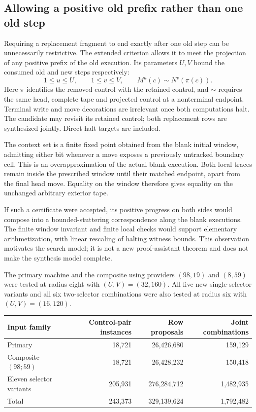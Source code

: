 \subsection{Allowing a positive old prefix rather than one old step}

Requiring a replacement fragment to end exactly after one old step can be
unnecessarily restrictive. The extended criterion allows it to meet the
projection of any positive prefix of the old execution. Its parameters
$U,V$ bound the consumed old and new steps respectively:
\[
  1\leq u\leq U,\qquad 1\leq v\leq V,
  \qquad M^{u}(c)\sim N^{v}(\pi(c)).
\]
Here $\pi$ identifies the removed control with the retained control, and
$\sim$ requires the same head, complete tape and projected control at a
nonterminal endpoint. Terminal write and move decorations are irrelevant
once both computations halt. The candidate may revisit its retained control;
both replacement rows are synthesized jointly. Direct halt targets are
included.

The context set is a finite fixed point obtained from the blank initial
window, admitting either bit whenever a move exposes a previously untracked
boundary cell. This is an overapproximation of the actual blank execution.
Both local traces remain inside the prescribed window until their matched
endpoint, apart from the final head move. Equality on the window therefore
gives equality on the unchanged arbitrary exterior tape.

If such a certificate were accepted, its positive progress on both sides
would compose into a bounded-stuttering correspondence along the blank
executions. The finite window invariant and finite local checks would
support elementary arithmetization, with linear rescaling of halting
witness bounds. This observation motivates the search model; it is not a
new proof-assistant theorem and does not make the synthesis model complete.

The primary machine and the composite using providers $(98,19)$ and
$(8,59)$ were tested at radius eight with $(U,V)=(32,160)$. All five new
single-selector variants and all six two-selector combinations were also
tested at radius six with $(U,V)=(16,120)$.

\begin{center}\small
\begin{tabular}{lrrr}
\hline
Input family & Control-pair instances & Row proposals & Joint combinations\\
\hline
Primary & 18,721 & 26,426,680 & 159,129\\
Composite $(98;59)$ & 18,721 & 26,428,232 & 150,418\\
Eleven selector variants & 205,931 & 276,284,712 & 1,482,935\\
\hline
Total & 243,373 & 329,139,624 & 1,792,482\\
\hline
\end{tabular}
\end{center}


